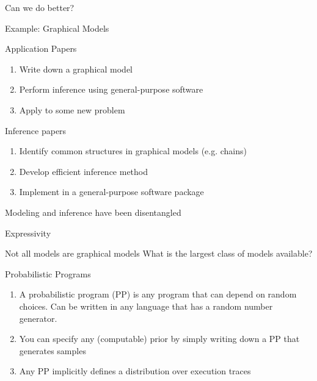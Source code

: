 \begin{frame}{Can we do better?}
  \begin{block}{Example: Graphical Models}  
  \end{block}
      \begin{block}{Application Papers}
      \begin{enumerate}
        \item Write down a graphical model
        \item Perform inference using general-purpose software
        \item Apply to some new problem
      \end{enumerate}
    \end{block}
      \begin{block}{Inference papers}
      \begin{enumerate}
        \item Identify common structures in graphical models (e.g. chains)
        \item Develop efficient inference method
        \item Implement in a general-purpose software package
      \end{enumerate}
    \end{block}  
  \begin{block}{}
      \vspace{-2\baselineskip}
  \large
    \begin{center}
    {
      {Modeling and inference have been disentangled}
    }	
    \end{center}
  \end{block}
\end{frame}



\begin{frame}{Expressivity}
  \begin{block}{Not all models are graphical models}  
  What is the largest class of models available?
  \end{block}
  \vspace{\baselineskip}
  \begin{block}{Probabilistic Programs}
      \begin{enumerate}
        \item A probabilistic program (PP) is any program that can depend on random choices.  Can be written in any language that has a random number generator.
        \item You can specify any (computable) prior by simply writing down a PP that generates samples
        \item Any PP implicitly defines a distribution over execution traces
      \end{enumerate}
    \end{block}
\end{frame}

